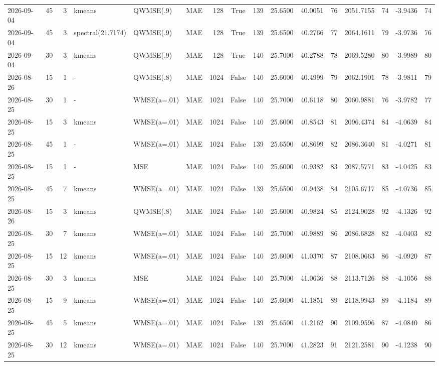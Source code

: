 \documentclass[10pt]{article}
\begin{document}
\begin{landscape}
\begin{longtable}{@{}lrrlllrcrrrrrrrr@{}}
2026-09-04 & 45 & 3 & kmeans & QWMSE(.9) & MAE & 128 & True & 139 & 25.6500 & 40.0051 & 76 & 2051.7155 & 74 & -3.9436 & 74 \\
2026-09-04 & 45 & 3 & spectral(21.7174) & QWMSE(.9) & MAE & 128 & True & 139 & 25.6500 & 40.2766 & 77 & 2064.1611 & 79 & -3.9736 & 76 \\
2026-09-04 & 30 & 3 & kmeans & QWMSE(.9) & MAE & 128 & True & 140 & 25.7000 & 40.2788 & 78 & 2069.5280 & 80 & -3.9989 & 80 \\
2026-08-26 & 15 & 1 & - & QWMSE(.8) & MAE & 1024 & False & 140 & 25.6000 & 40.4999 & 79 & 2062.1901 & 78 & -3.9811 & 79 \\
2026-08-25 & 30 & 1 & - & WMSE(a=.01) & MAE & 1024 & False & 140 & 25.7000 & 40.6118 & 80 & 2060.9881 & 76 & -3.9782 & 77 \\
2026-08-25 & 15 & 3 & kmeans & WMSE(a=.01) & MAE & 1024 & False & 140 & 25.6000 & 40.8543 & 81 & 2096.4374 & 84 & -4.0639 & 84 \\
2026-08-25 & 45 & 1 & - & WMSE(a=.01) & MAE & 1024 & False & 139 & 25.6500 & 40.8699 & 82 & 2086.3640 & 81 & -4.0271 & 81 \\
2026-08-25 & 15 & 1 & - & MSE & MAE & 1024 & False & 140 & 25.6000 & 40.9382 & 83 & 2087.5771 & 83 & -4.0425 & 83 \\
2026-08-25 & 45 & 7 & kmeans & WMSE(a=.01) & MAE & 1024 & False & 139 & 25.6500 & 40.9438 & 84 & 2105.6717 & 85 & -4.0736 & 85 \\
2026-08-26 & 15 & 3 & kmeans & QWMSE(.8) & MAE & 1024 & False & 140 & 25.6000 & 40.9824 & 85 & 2124.9028 & 92 & -4.1326 & 92 \\
2026-08-25 & 30 & 7 & kmeans & WMSE(a=.01) & MAE & 1024 & False & 140 & 25.7000 & 40.9889 & 86 & 2086.6828 & 82 & -4.0403 & 82 \\
2026-08-25 & 15 & 12 & kmeans & WMSE(a=.01) & MAE & 1024 & False & 140 & 25.6000 & 41.0370 & 87 & 2108.0663 & 86 & -4.0920 & 87 \\
2026-08-25 & 30 & 3 & kmeans & MSE & MAE & 1024 & False & 140 & 25.7000 & 41.0636 & 88 & 2113.7126 & 88 & -4.1056 & 88 \\
2026-08-25 & 15 & 9 & kmeans & WMSE(a=.01) & MAE & 1024 & False & 140 & 25.6000 & 41.1851 & 89 & 2118.9943 & 89 & -4.1184 & 89 \\
2026-08-25 & 45 & 5 & kmeans & WMSE(a=.01) & MAE & 1024 & False & 139 & 25.6500 & 41.2162 & 90 & 2109.9596 & 87 & -4.0840 & 86 \\
2026-08-25 & 30 & 12 & kmeans & WMSE(a=.01) & MAE & 1024 & False & 140 & 25.7000 & 41.2823 & 91 & 2121.2581 & 90 & -4.1238 & 90 \\

\end{longtable}
\end{landscape}
\end{document}
